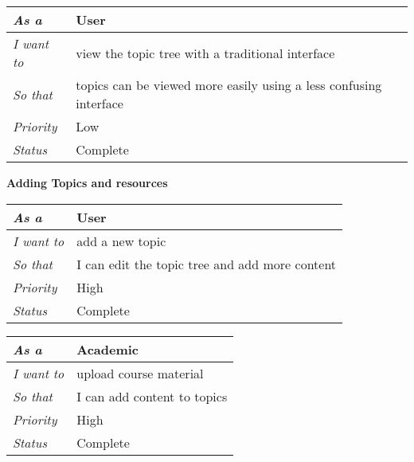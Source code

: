 \begin{table}[h!]
\begin{tabular}{|l|l|}
\hline
\textit{As a}      & User                                                              \\ \hline
\textit{I want to} & view the topic tree with a traditional interface                  \\ \hline
\textit{So that}   & topics can be viewed more easily using a less confusing interface \\ \hline
\textit{Priority}  & {\color[HTML]{3166FF} Low}                                        \\ \hline
\textit{Status}    & Complete                                                          \\ \hline
\end{tabular}
\end{table}
\FloatBarrier

\textbf{Adding Topics and resources}
\FloatBarrier
\begin{table}[h!]
\begin{tabular}{|l|l|}
\hline
\textit{As a}      & User                                           \\ \hline
\textit{I want to} & add a new topic                                \\ \hline
\textit{So that}   & I can edit the topic tree and add more content \\ \hline
\textit{Priority}  & {\color[HTML]{FE0000} High}                    \\ \hline
\textit{Status}    & Complete                                       \\ \hline              
\end{tabular}
\end{table}

\begin{table}[h!]
\begin{tabular}{|l|l|}
\hline
\textit{As a}      & Academic                       \\ \hline
\textit{I want to} & upload course material      \\ \hline
\textit{So that}   & I can add content to topics       \\ \hline
\textit{Priority}  & {\color[HTML]{FE0000} High} \\ \hline
\textit{Status}    & Complete                    \\ \hline 
\end{tabular}
\end{table}

